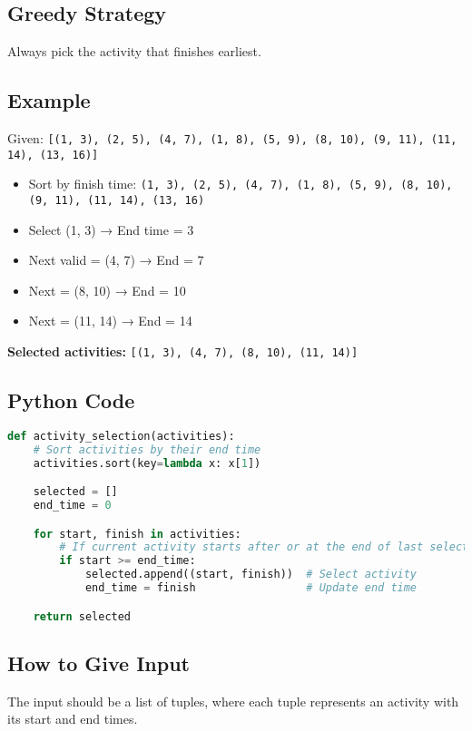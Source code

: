 \documentclass[14pt]{extarticle}
\begin{document}
\subsection*{Greedy Strategy}
Always pick the activity that finishes earliest.

\subsection*{Example}

Given:  
\texttt{[(1, 3), (2, 5), (4, 7), (1, 8), (5, 9), (8, 10), (9, 11), (11, 14), (13, 16)]}

\begin{itemize}
    \item Sort by finish time: \texttt{(1, 3), (2, 5), (4, 7), (1, 8), (5, 9), (8, 10), (9, 11), (11, 14), (13, 16)}
    \item Select (1, 3) → End time = 3
    \item Next valid = (4, 7) → End = 7
    \item Next = (8, 10) → End = 10
    \item Next = (11, 14) → End = 14
\end{itemize}

\textbf{Selected activities:} \texttt{[(1, 3), (4, 7), (8, 10), (11, 14)]}
\newpage
\subsection*{Python Code}
\begin{lstlisting}[language=Python]
def activity_selection(activities):
    # Sort activities by their end time
    activities.sort(key=lambda x: x[1])

    selected = []
    end_time = 0

    for start, finish in activities:
        # If current activity starts after or at the end of last selected
        if start >= end_time:
            selected.append((start, finish))  # Select activity
            end_time = finish                 # Update end time

    return selected
\end{lstlisting}

\subsection*{How to Give Input}

The input should be a list of tuples, where each tuple represents an activity with its start and end times.
\end{document}
